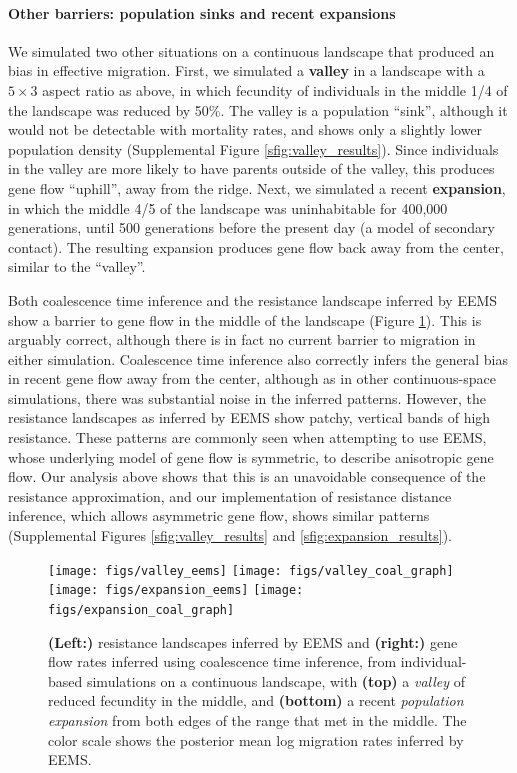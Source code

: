 \documentclass{article}
\begin{document}
\paragraph{Other barriers: population sinks and recent expansions}
We simulated two other situations on a continuous landscape that produced an bias in effective migration.
First, we simulated a \textbf{valley} in a landscape with a $5 \times 3$ aspect ratio as above, 
in which fecundity of individuals in the middle 1/4 of the landscape was reduced by 50\%.
The valley is a population ``sink'',
although it would not be detectable with mortality rates,
and shows only a slightly lower population density (Supplemental Figure \ref{sfig:valley_results}).
Since individuals in the valley are more likely to have parents outside of the valley,
this produces gene flow ``uphill'', away from the ridge.
Next, we simulated a recent \textbf{expansion},
in which the middle 4/5 of the landscape was uninhabitable for 400,000 generations, 
until 500 generations before the present day
(a model of secondary contact).
The resulting expansion produces gene flow back away from the center,
similar to the ``valley''.

Both coalescence time inference and the resistance landscape inferred by EEMS
show a barrier to gene flow in the middle of the landscape (Figure \ref{fig:more_barriers}).
This is arguably correct, 
although there is in fact no current barrier to migration in either simulation.
Coalescence time inference also correctly infers 
the general bias in recent gene flow away from the center,
although as in other continuous-space simulations, 
there was substantial noise in the inferred patterns.
However, the resistance landscapes as inferred by EEMS show patchy, vertical bands of high resistance.
These patterns are commonly seen when attempting to use EEMS, 
whose underlying model of gene flow is symmetric,
to describe anisotropic gene flow.
Our analysis above shows that this is an unavoidable consequence of the resistance approximation,
and our implementation of resistance distance inference,
which allows asymmetric gene flow, shows similar patterns
(Supplemental Figures \ref{sfig:valley_results} and \ref{sfig:expansion_results}).

\begin{figure}
\centering
    \texttt{[image: figs/valley\_eems]}
    \texttt{[image: figs/valley\_coal\_graph]}
    \texttt{[image: figs/expansion\_eems]}
    \texttt{[image: figs/expansion\_coal\_graph]}
    \caption{
        \textbf{(Left:)}
        resistance landscapes inferred by EEMS
        and 
        \textbf{(right:)}
        gene flow rates inferred using coalescence time inference,
        from individual-based simulations on a continuous landscape,
        with \textbf{(top)} a \emph{valley} of reduced fecundity in the middle, and
        \textbf{(bottom)} a recent \emph{population expansion} from both edges of the range
        that met in the middle.
        The color scale shows the posterior mean log migration rates inferred by EEMS.
        \label{fig:more_barriers}
    }
\end{figure}
\end{document}
